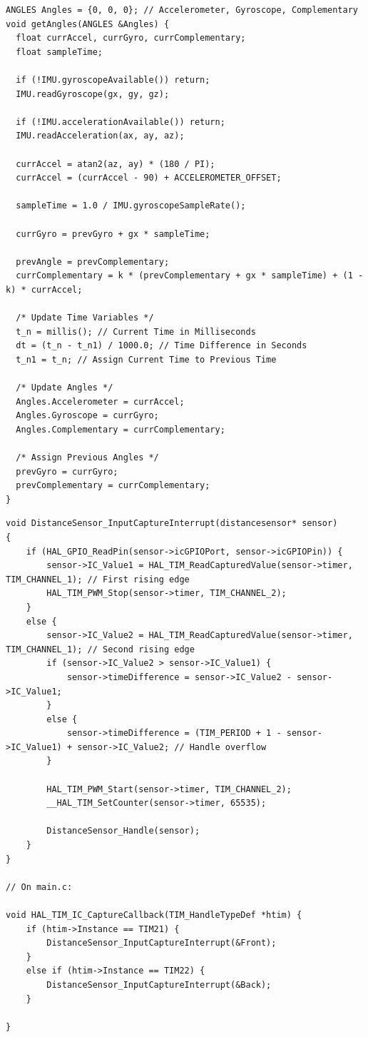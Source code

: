 \documentclass{article}
\begin{document}
\begin{lstlisting}[caption={Arduino IMU Complementary Filter Firmware Implementation}, label={lst:arduino_angle_code}]
ANGLES Angles = {0, 0, 0}; // Accelerometer, Gyroscope, Complementary
void getAngles(ANGLES &Angles) {
  float currAccel, currGyro, currComplementary;
  float sampleTime;

  if (!IMU.gyroscopeAvailable()) return;
  IMU.readGyroscope(gx, gy, gz);

  if (!IMU.accelerationAvailable()) return;
  IMU.readAcceleration(ax, ay, az);

  currAccel = atan2(az, ay) * (180 / PI);
  currAccel = (currAccel - 90) + ACCELEROMETER_OFFSET;

  sampleTime = 1.0 / IMU.gyroscopeSampleRate();

  currGyro = prevGyro + gx * sampleTime;

  prevAngle = prevComplementary;
  currComplementary = k * (prevComplementary + gx * sampleTime) + (1 - k) * currAccel;

  /* Update Time Variables */
  t_n = millis(); // Current Time in Milliseconds
  dt = (t_n - t_n1) / 1000.0; // Time Difference in Seconds
  t_n1 = t_n; // Assign Current Time to Previous Time

  /* Update Angles */
  Angles.Accelerometer = currAccel;
  Angles.Gyroscope = currGyro;
  Angles.Complementary = currComplementary;

  /* Assign Previous Angles */
  prevGyro = currGyro;
  prevComplementary = currComplementary;
}
\end{lstlisting}

\begin{lstlisting}[caption={STM32 HC-SR04 Firmware Implementation}, label={lst:stm32_distancesensor_code}]
void DistanceSensor_InputCaptureInterrupt(distancesensor* sensor)
{
    if (HAL_GPIO_ReadPin(sensor->icGPIOPort, sensor->icGPIOPin)) {
        sensor->IC_Value1 = HAL_TIM_ReadCapturedValue(sensor->timer, TIM_CHANNEL_1); // First rising edge
        HAL_TIM_PWM_Stop(sensor->timer, TIM_CHANNEL_2);
    }
    else {
        sensor->IC_Value2 = HAL_TIM_ReadCapturedValue(sensor->timer, TIM_CHANNEL_1); // Second rising edge
        if (sensor->IC_Value2 > sensor->IC_Value1) {
            sensor->timeDifference = sensor->IC_Value2 - sensor->IC_Value1;
        }
        else {
            sensor->timeDifference = (TIM_PERIOD + 1 - sensor->IC_Value1) + sensor->IC_Value2; // Handle overflow
        }

        HAL_TIM_PWM_Start(sensor->timer, TIM_CHANNEL_2);
        __HAL_TIM_SetCounter(sensor->timer, 65535);

        DistanceSensor_Handle(sensor);
    }
}

// On main.c:

void HAL_TIM_IC_CaptureCallback(TIM_HandleTypeDef *htim) {
    if (htim->Instance == TIM21) {
		DistanceSensor_InputCaptureInterrupt(&Front);
	}
	else if (htim->Instance == TIM22) {
		DistanceSensor_InputCaptureInterrupt(&Back);
	}

}
\end{lstlisting}
\end{document}
